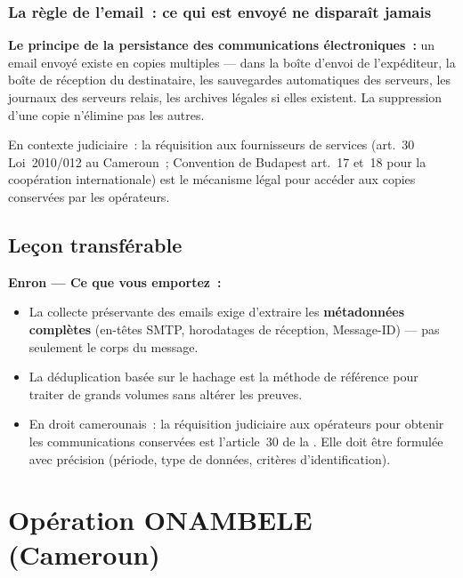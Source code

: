 \subsubsection{La règle de l'email~: ce qui est envoyé ne disparaît jamais}

\begin{boxalert}
\textbf{Le principe de la persistance des communications électroniques~:}
un email envoyé existe en copies multiples --- dans la boîte d'envoi de
l'expéditeur, la boîte de réception du destinataire, les sauvegardes
automatiques des serveurs, les journaux des serveurs relais, les archives
légales si elles existent. La suppression d'une copie n'élimine pas les autres.

En contexte judiciaire~: la réquisition aux fournisseurs de services
(art.~30 Loi~2010/012 au Cameroun~; Convention de Budapest art.~17 et~18
pour la coopération internationale) est le mécanisme légal pour accéder
aux copies conservées par les opérateurs.
\end{boxalert}

\subsection{Leçon transférable}

\begin{boxresume}
\textbf{Enron --- Ce que vous emportez~:}
\begin{itemize}
    \item La collecte préservante des emails exige d'extraire les
          \textbf{métadonnées complètes} (en-têtes SMTP, horodatages
          de réception, Message-ID) --- pas seulement le corps du message.
    \item La déduplication basée sur le hachage est la méthode de référence
          pour traiter de grands volumes sans altérer les preuves.
    \item En droit camerounais~: la réquisition judiciaire aux opérateurs
          pour obtenir les communications conservées est l'article~30
          de la . Elle doit être formulée avec précision
          (période, type de données, critères d'identification).
\end{itemize}
\end{boxresume}

\section{Opération ONAMBELE (Cameroun)}
\label{sec:onambele}

